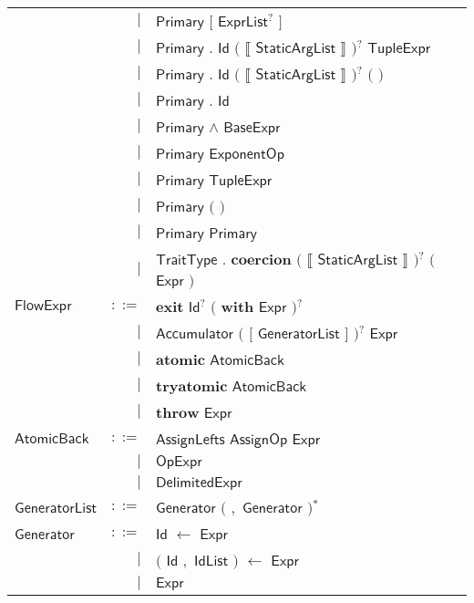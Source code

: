 \begin{longtable}[l]{p{3cm}rl}
 & $\big|$ &  $\mathsf{Primary}$ $\mathbf{[}$ $\mathsf{ExprList}$$^?$ $\mathbf{]}$ \\
 & $\big|$ &  $\mathsf{Primary}$ $\mathbf{.}$ $\mathsf{Id}$ $\big($  $\mathbf{\llbracket}$ $\mathsf{StaticArgList}$ $\mathbf{\rrbracket}$ $\big)$$^?$ $\mathsf{TupleExpr}$ \\
 & $\big|$ &  $\mathsf{Primary}$ $\mathbf{.}$ $\mathsf{Id}$ $\big($  $\mathbf{\llbracket}$ $\mathsf{StaticArgList}$ $\mathbf{\rrbracket}$ $\big)$$^?$ $\mathbf{(}$ $\mathbf{)}$ \\
 & $\big|$ &  $\mathsf{Primary}$ $\mathbf{.}$ $\mathsf{Id}$ \\
 & $\big|$ &  $\mathsf{Primary}$ $\mathbf{\wedge}$ $\mathsf{BaseExpr}$ \\
 & $\big|$ &  $\mathsf{Primary}$ $\mathsf{ExponentOp}$ \\
 & $\big|$ &  $\mathsf{Primary}$ $\mathsf{TupleExpr}$ \\
 & $\big|$ &  $\mathsf{Primary}$ $\mathbf{(}$ $\mathbf{)}$ \\
 & $\big|$ &  $\mathsf{Primary}$ $\mathsf{Primary}$ \\
 & $\big|$ &  $\mathsf{TraitType}$ $\mathbf{.}$ $\mathbf{coercion}$ $\big($  $\mathbf{\llbracket}$ $\mathsf{StaticArgList}$ $\mathbf{\rrbracket}$ $\big)$$^?$ $\big($  $\mathsf{Expr}$ $\big)$ \\
$\mathsf{FlowExpr}$ &  $\mathsf{::=}$  & $\mathbf{exit}$ $\mathsf{Id}$$^?$ $\big($  $\mathbf{with}$ $\mathsf{Expr}$ $\big)$$^?$ \\
 & $\big|$ &  $\mathsf{Accumulator}$ $\big($  $\mathbf{[}$ $\mathsf{GeneratorList}$ $\mathbf{]}$ $\big)$$^?$ $\mathsf{Expr}$ \\
 & $\big|$ &  $\mathbf{atomic}$ $\mathsf{AtomicBack}$ \\
 & $\big|$ &  $\mathbf{tryatomic}$ $\mathsf{AtomicBack}$ \\
 & $\big|$ &  $\mathbf{throw}$ $\mathsf{Expr}$ \\
$\mathsf{AtomicBack}$ &  $\mathsf{::=}$  & $\mathsf{AssignLefts}$ $\mathsf{AssignOp}$ $\mathsf{Expr}$ \\
 & $\big|$ &  $\mathsf{OpExpr}$ \\
 & $\big|$ &  $\mathsf{DelimitedExpr}$ \\
$\mathsf{GeneratorList}$ &  $\mathsf{::=}$  & $\mathsf{Generator}$ $\big($  $\mathbf{,}$ $\mathsf{Generator}$ $\big)$$^*$ \\
$\mathsf{Generator}$ &  $\mathsf{::=}$  & $\mathsf{Id}$ $\mathbf{\leftarrow}$ $\mathsf{Expr}$ \\
 & $\big|$ &  $\mathbf{(}$ $\mathsf{Id}$ $\mathbf{,}$ $\mathsf{IdList}$ $\mathbf{)}$ $\mathbf{\leftarrow}$ $\mathsf{Expr}$ \\
 & $\big|$ &  $\mathsf{Expr}$ \\
\end{longtable} \hfill 

